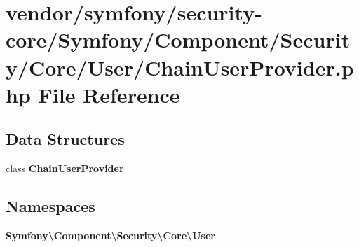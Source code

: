 \section{vendor/symfony/security-\/core/\+Symfony/\+Component/\+Security/\+Core/\+User/\+Chain\+User\+Provider.php File Reference}
\label{_chain_user_provider_8php}
\subsection*{Data Structures}
\begin{DoxyCompactItemize}
\item 
class {\bf Chain\+User\+Provider}
\end{DoxyCompactItemize}
\subsection*{Namespaces}
\begin{DoxyCompactItemize}
\item 
 {\bf Symfony\textbackslash{}\+Component\textbackslash{}\+Security\textbackslash{}\+Core\textbackslash{}\+User}
\end{DoxyCompactItemize}
